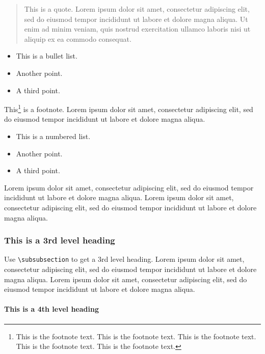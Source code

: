 \documentclass[a4paper,num-refs]{oup-contemporary}
\begin{document}
\begin{quote}
This is a quote. Lorem ipsum dolor sit amet, consectetur adipiscing elit, sed do eiusmod tempor incididunt ut labore et dolore magna aliqua. Ut enim ad minim veniam, quis nostrud exercitation ullamco laboris nisi ut aliquip ex ea commodo consequat. 
\end{quote}

\begin{itemize}
\item This is a bullet list.
\item Another point.
\item A third point.
\end{itemize}

This\footnote{This is the footnote text. This is the footnote text. This is the footnote text. This is the footnote text. This is the footnote text.} is a footnote. Lorem ipsum dolor sit amet, consectetur adipiscing elit, sed do eiusmod tempor incididunt ut labore et dolore magna aliqua.

\begin{itemize}
\item This is a numbered list.
\item Another point.
\item A third point.
\end{itemize}

Lorem ipsum dolor sit amet, consectetur adipiscing elit, sed do eiusmod tempor incididunt ut labore et dolore magna aliqua. Lorem ipsum dolor sit amet, consectetur adipiscing elit, sed do eiusmod tempor incididunt ut labore et dolore magna aliqua.


\subsubsection{This is a 3rd level heading}

Use \verb|\subsubsection| to get a 3rd level heading.
Lorem ipsum dolor sit amet, consectetur adipiscing elit, sed do eiusmod tempor incididunt ut labore et dolore magna aliqua. Lorem ipsum dolor sit amet, consectetur adipiscing elit, sed do eiusmod tempor incididunt ut labore et dolore magna aliqua. 


\paragraph{This is a 4th level heading}
\end{document}
